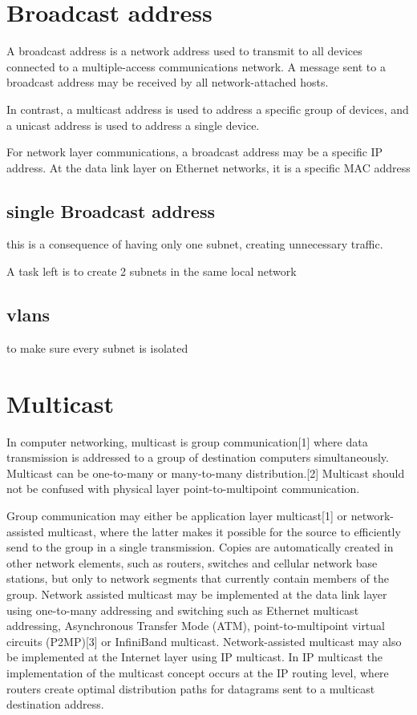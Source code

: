 \documentclass[a4paper,12pt]{book}
\begin{document}
\section{Broadcast address}
A broadcast address is a network address used to transmit to all devices connected to a multiple-access communications network. A message sent to a broadcast address may be received by all network-attached hosts.

In contrast, a multicast address is used to address a specific group of devices, and a unicast address is used to address a single device.

For network layer communications, a broadcast address may be a specific IP address. At the data link layer on Ethernet networks, it is a specific MAC address
\subsection{single Broadcast address}
this is a consequence of having only one subnet, creating unnecessary traffic.

A task left is to create 2 subnets in the same local network
\subsection{vlans}
to make sure every subnet is isolated

\section{Multicast}
In computer networking, multicast is group communication[1] where data transmission is addressed to a group of destination computers simultaneously. Multicast can be one-to-many or many-to-many distribution.[2] Multicast should not be confused with physical layer point-to-multipoint communication.

Group communication may either be application layer multicast[1] or network-assisted multicast, where the latter makes it possible for the source to efficiently send to the group in a single transmission. Copies are automatically created in other network elements, such as routers, switches and cellular network base stations, but only to network segments that currently contain members of the group. Network assisted multicast may be implemented at the data link layer using one-to-many addressing and switching such as Ethernet multicast addressing, Asynchronous Transfer Mode (ATM), point-to-multipoint virtual circuits (P2MP)[3] or InfiniBand multicast. Network-assisted multicast may also be implemented at the Internet layer using IP multicast. In IP multicast the implementation of the multicast concept occurs at the IP routing level, where routers create optimal distribution paths for datagrams sent to a multicast destination address.
\end{document}
